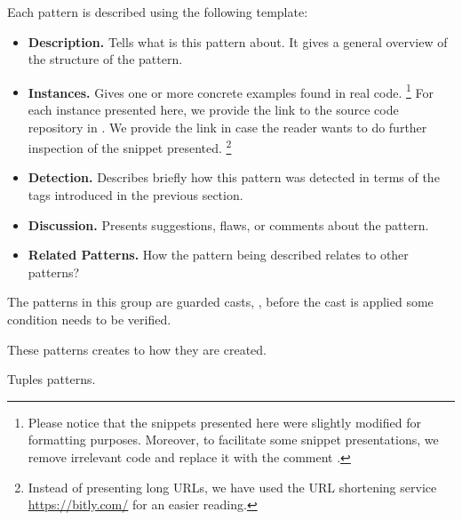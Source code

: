 Each pattern is described using the following template:

\begin{itemize}
\item \textbf{Description.}
Tells what is this pattern about.
It gives a general overview of the structure of the pattern.
\item \textbf{Instances.}
Gives one or more concrete examples found in real code.%
\footnote{Please notice that the snippets presented here were slightly
modified for formatting purposes.
Moreover, to facilitate some snippet presentations,
we remove irrelevant code and replace it with the
comment \code{// [...]}.}
For each instance presented here, we provide the link to the source code repository in \lgtm{}.
We provide the link in case the reader wants to do further inspection
of the snippet presented.%
\footnote{Instead of presenting \lgtm{} long URLs,
we have used the URL shortening service \url{https://bitly.com/}
for an easier reading.}
\item \textbf{Detection.}
Describes briefly how this pattern was detected in terms of the tags introduced in the previous section.
\item \textbf{Discussion.}
Presents suggestions, flaws, or comments about the pattern.
\item \textbf{Related Patterns.}
How the pattern being described relates to other patterns?
\end{itemize}


The patterns in this group are guarded casts, \ie, before the cast is applied some condition needs to be verified.







These patterns creates to how they are created.










Tuples patterns.





